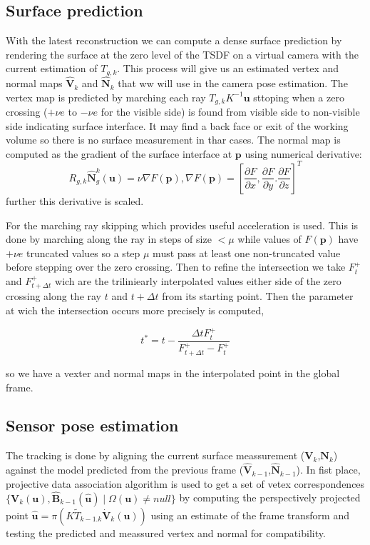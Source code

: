 \subsection{Surface prediction}
With the latest reconstruction we can compute a dense surface prediction by rendering the surface at the zero level of the TSDF on a virtual camera with the current estimation of $T_{g,k}$. This process will give us an estimated vertex and normal maps $\hat{\mathbf{V}}_k$ and $\hat{\mathbf{N}}_k$ that ww will use in the camera pose estimation.
The vertex map is predicted by marching each ray $T_{g,k}K^{-1}\mathbf{u}$ sttoping when a zero crossing ($+\nu e$ to $-\nu e$ for the visible side) is found from visible side to non-visible side indicating surface interface.
It may find a back face or exit of the working volume so there is no surface measurement in thar cases.
The normal map is computed as the gradient of the surface interface at $\mathbf{p}$ using numerical derivative:
\begin{equation}
 R_{g,k} \hat{\mathbf{N}}_g^k(\mathbf{u}) = \nu \nabla F(\mathbf{p}), \nabla F(\mathbf{p}) = \left [ \frac{\partial F}{\partial x}, \frac{\partial F}{\partial y}. \frac{\partial F}{\partial z} \right ]^T
\end{equation}
further this derivative is scaled.

For the marching ray skipping which provides useful acceleration is used. This is done by marching along the ray in steps of size $< \mu$ while values of $F(\mathbf{p})$ have $+ \nu e$ truncated values so a step $\mu$ must pass at least one non-truncated value before stepping over the zero crossing.
Then to refine the intersection we take $F^+_t$ and $F^+_{t+\Delta t}$ wich are the triliniearly interpolated values either side of the zero crossing along the ray $t$ and $t+\Delta t$ from its starting point.
Then the parameter at wich the intersection occurs more precisely is computed,

\begin{equation}
t^* = t - \frac{\Delta t F^+_t}{F^+_{t+\Delta t} - F^+_t}
\end{equation}

so we have a vexter and normal maps in the interpolated point in the global frame.

\subsection{Sensor pose estimation}

The tracking is done by aligning the current surface meassurement ($\mathbf{V}_k$,$\mathbf{N}_k$) against the model predicted from the previous frame ($\hat{\mathbf{V}}_{k-1}$,$\hat{\mathbf{N}}_{k-1}$).
In fist place, projective data association algorithm is used to get a set of vetex correspondences $\{ \mathbf{V}_k(\mathbf{u}), \hat{\mathbf{B}}_{k-1}(\hat{\mathbf{u}}) \mid \Omega(\mathbf{u}) \neq null \}$ by computing the perspectively projected point $\hat{\mathbf{u}} = \pi(K \tilde{T}_{k-1.k} \dot{\mathbf{V}}_k(\mathbf{u}))$ using an estimate of the frame transform and testing the predicted and meassured vertex and normal for compatibility.

